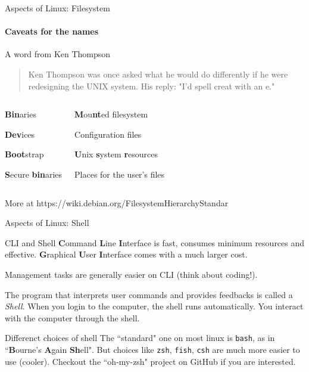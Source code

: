 \begin{frame}{Aspects of Linux: Filesystem}
\framesubtitle{Caveats for the names}

\begin{block}{A word from Ken Thompson}
\begin{quote}
	Ken Thompson was once asked what he would do differently if he were redesigning the UNIX system. His reply: "I'd spell creat with an e."
\end{quote}
\end{block}

\vspace{-0.15in}
\begin{columns}
	\begin{description}[/boot]
	\item[/bin] \textbf{Bin}aries
	\item[/dev] \textbf{Dev}ices
	\item[/boot] \textbf{Boot}strap
	\item[/sbin] \textbf{S}ecure \textbf{bin}aries
	\end{description}
	\begin{description}[/home]
	\item[/mnt] \textbf{M}ou\textbf{nt}ed filesystem
	\item[/etc] Configuration files
	\item[/usr] \textbf{U}nix \textbf{s}ystem \textbf{r}esources
	\item[/home] Places for the user's files
	\end{description}
\end{columns}

\vspace{0.1in} \tiny{More at https://wiki.debian.org/FilesystemHierarchyStandar}
\end{frame}

\begin{frame}{Aspects of Linux: Shell}

\begin{block}{CLI and Shell}
\textbf{C}ommand \textbf{L}ine \textbf{I}nterface is fast, consumes minimum resources and effective. \textbf{G}raphical \textbf{U}ser \textbf{I}nterface comes with a much larger cost. 

Management tasks are generally easier on CLI (think about coding!).

The program that interprets user commands and provides feedbacks is called a \textit{Shell}. When you login to the computer, the shell runs automatically. You interact with the computer through the shell. 
\end{block}

\begin{block}{Differenct choices of shell}
	The ``standard" one on most linux is \texttt{bash}, as in ``\textbf{B}ourne's \textbf{A}gain \textbf{Sh}ell". But choices like \texttt{zsh}, \texttt{fish}, \texttt{csh} are much more easier to use (cooler). Checkout the ``oh-my-zsh" project on GitHub if you are interested.
\end{block}
\end{frame}

